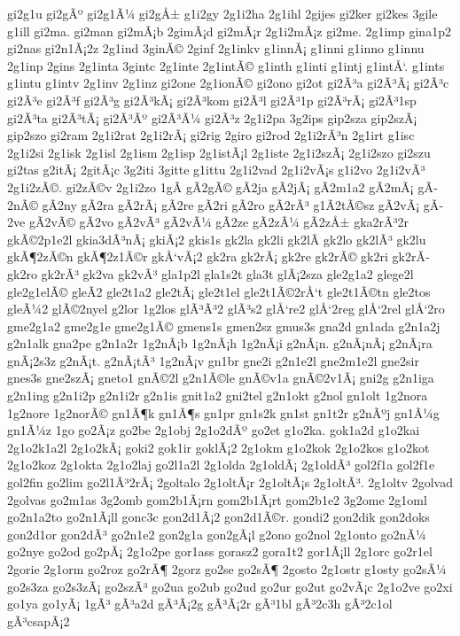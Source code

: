 {gi2g1u
gi2gÃº
gi2g1Ã¼
gi2gÅ±
g1i2gy
2g1i2ha
2g1ihl
2gijes
gi2ker
gi2kes
3gile
g1ill
gi2ma.
gi2man
gi2mÃ¡b
2gimÃ¡d
gi2mÃ¡r
2g1i2mÃ¡z
gi2me.
2g1imp
gina1p2
gi2nas
gi2n1Ã¡2z
2g1ind
3ginÃ©
2ginf
2g1inkv
g1innÃ¡
g1inni
g1inno
g1innu
2g1inp
2gins
2g1inta
3gintc
2g1inte
2g1intÃ©
g1inth
g1inti
g1intj
g1intÅ‘.
g1ints
g1intu
g1intv
2g1inv
2g1inz
gi2one
2g1ionÃ©
gi2ono
gi2ot
gi2Ã³a
gi2Ã³Ã¡
gi2Ã³c
gi2Ã³e
gi2Ã³f
gi2Ã³g
gi2Ã³kÃ¡
gi2Ã³kom
gi2Ã³l
gi2Ã³1p
gi2Ã³rÃ¡
gi2Ã³1sp
gi2Ã³ta
gi2Ã³tÃ¡
gi2Ã³Ãº
gi2Ã³Ã¼
gi2Ã³z
2g1i2pa
3g2ips
gip2sza
gip2szÃ¡
gip2szo
gi2ram
2g1i2rat
2g1i2rÃ¡
gi2rig
2giro
gi2rod
2g1i2rÃ³n
2g1irt
g1isc
2g1i2si
2g1isk
2g1isl
2g1ism
2g1isp
2g1istÃ¡l
2g1iste
2g1i2szÃ¡
2g1i2szo
gi2szu
gi2tas
g2itÃ¡
2gitÃ¡c
3g2iti
3gitte
g1ittu
2g1i2vad
2g1i2vÃ¡s
g1i2vo
2g1i2vÃ³
2g1i2zÃ©.
gi2zÃ©v
2g1i2zo
1gÃ­
gÃ­2gÃ©
gÃ­2ja
gÃ­2jÃ¡
gÃ­2m1a2
gÃ­2mÃ¡
gÃ­2nÃ©
gÃ­2ny
gÃ­2ra
gÃ­2rÃ¡
gÃ­2re
gÃ­2ri
gÃ­2ro
gÃ­2rÃ³
g1Ã­2tÃ©sz
gÃ­2vÃ¡
gÃ­2ve
gÃ­2vÃ©
gÃ­2vo
gÃ­2vÃ³
gÃ­2vÃ¼
gÃ­2ze
gÃ­2zÃ¼
gÃ­2zÅ±
gka2rÃ³2r
gkÃ©2p1e2l
gkia3dÃ³nÃ¡
gkiÃ¡2
gkis1s
gk2la
gk2li
gk2lÃ­
gk2lo
gk2lÃ³
gk2lu
gkÃ¶2zÃ©n
gkÃ¶2z1Ã©r
gkÅ‘vÃ¡2
gk2ra
gk2rÃ¡
gk2re
gk2rÃ©
gk2ri
gk2rÃ­
gk2ro
gk2rÃ³
gk2va
gk2vÃ³
gla1p2l
gla1s2t
gla3t
glÃ¡2sza
gle2g1a2
glege2l
gle2g1elÃ©
gleÃ­2
gle2t1a2
gle2tÃ¡
gle2t1el
gle2t1Ã©2rÅ‘t
gle2t1Ã©tn
gle2tos
gleÃ¼2
glÃ©2nyel
g2lor
1g2los
glÃ³Ã³2
glÃ³s2
glÅ‘re2
glÅ‘2reg
glÅ‘2rel
glÅ‘2ro
gme2g1a2
gme2g1e
gme2g1Ã©
gmens1s
gmen2sz
gmus3s
gna2d
gn1ada
g2n1a2j
g2n1alk
gna2pe
g2n1a2r
1g2nÃ¡b
1g2nÃ¡h
1g2nÃ¡i
g2nÃ¡n.
g2nÃ¡nÃ¡
g2nÃ¡ra
gnÃ¡2s3z
g2nÃ¡t.
g2nÃ¡tÃ³
1g2nÃ¡v
gn1br
gne2i
g2n1e2l
gne2m1e2l
gne2sir
gnes3s
gne2szÃ¡
gneto1
gnÃ©2l
g2n1Ã©le
gnÃ©v1a
gnÃ©2v1Ã¡
gni2g
g2n1iga
g2n1ing
g2n1i2p
g2n1i2r
g2n1is
gnit1a2
gni2tel
g2n1okt
g2nol
gn1olt
1g2nora
1g2nore
1g2norÃ©
gn1Ã¶k
gn1Ã¶s
gn1pr
gn1s2k
gn1st
gn1t2r
g2nÃºj
gn1Ã¼g
gn1Ã¼z
1go
go2Ã¡z
go2be
2g1obj
2g1o2dÃº
go2et
g1o2ka.
gok1a2d
g1o2kai
2g1o2k1a2l
2g1o2kÃ¡
goki2
gok1ir
goklÃ¡2
2g1okm
g1o2kok
2g1o2kos
g1o2kot
2g1o2koz
2g1okta
2g1o2laj
go2l1a2l
2g1olda
2g1oldÃ¡
2g1oldÃ³
gol2f1a
gol2f1e
gol2fin
go2lim
go2l1Ã³2rÃ¡
2goltalo
2g1oltÃ¡r
2g1oltÃ¡s
2g1oltÃ³.
2g1oltv
2golvad
2golvas
go2m1as
3g2omb
gom2b1Ã¡rn
gom2b1Ã¡rt
gom2b1e2
3g2ome
2g1oml
go2n1a2to
go2n1Ã¡ll
gonc3c
gon2d1Ã¡2
gon2d1Ã©r.
gondi2
gon2dik
gon2doks
gon2d1or
gon2dÃ³
go2n1e2
gon2g1a
gon2gÃ¡l
g2ono
go2nol
2g1onto
go2nÃ¼
go2nye
go2od
go2pÃ¡
2g1o2pe
gor1ass
gorasz2
gora1t2
gor1Ã¡ll
2g1orc
go2r1el
2gorie
2g1orm
go2roz
go2rÃ¶
2gorz
go2se
go2sÃ¶
2gosto
2g1ostr
g1osty
go2sÃ¼
go2s3za
go2s3zÃ¡
go2szÃ³
go2ua
go2ub
go2ud
go2ur
go2ut
go2vÃ¡c
2g1o2ve
go2xi
go1ya
go1yÃ¡
1gÃ³
gÃ³a2d
gÃ³Ã¡2g
gÃ³Ã¡2r
gÃ³1bl
gÃ³2c3h
gÃ³2c1ol
gÃ³csapÃ¡2
}
